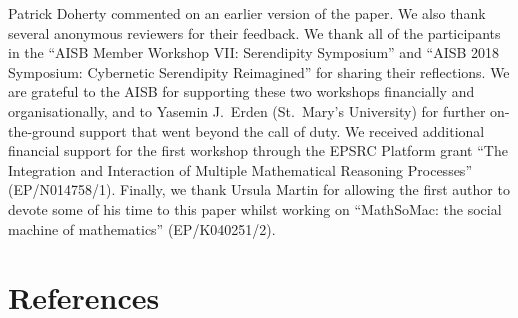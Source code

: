 \documentclass[natbib,a4paper,preprint,number,sort&compress,times]{elsarticle}
\begin{document}
Patrick Doherty commented on an earlier version of the paper.
We also thank several anonymous reviewers for their feedback.
We thank all of the participants in the ``AISB Member Workshop VII:
Serendipity Symposium'' and ``AISB 2018 Symposium: Cybernetic
Serendipity Reimagined'' for sharing their reflections.
We are grateful to the AISB for supporting these two workshops
financially and organisationally, and to Yasemin J.~Erden (St.~Mary's
University) for further on-the-ground support that went beyond the
call of duty.
We received additional financial support for the first workshop
through the EPSRC Platform grant ``The Integration and Interaction of
Multiple Mathematical Reasoning Processes'' (EP/N014758/1).
Finally, we thank Ursula Martin for allowing the first author to
devote some of his time to this paper whilst working on ``MathSoMac:
the social machine of mathematics'' (EP/K040251/2).






\DeclareRobustCommand{\VAN}[3]{#3}

\section*{References}







\end{document}
